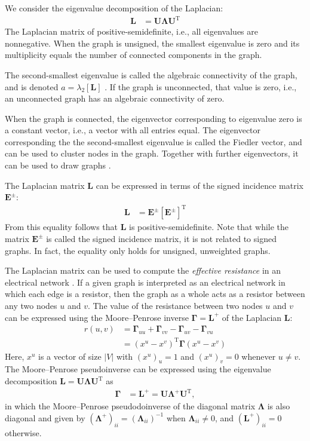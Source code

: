 \documentclass{article}
\begin{document}
We consider the eigenvalue decomposition of the Laplacian:
\begin{align}
  \mathbf L &= \mathbf U \mathbf \Lambda \mathbf U^{\mathrm T}
\end{align}
The Laplacian matrix of positive-semidefinite, i.e., all eigenvalues are
nonnegative.  
When the graph is unsigned, the smallest eigenvalue is zero and its
multiplicity equals the number of connected components in the graph. 

The second-smallest eigenvalue is called the algebraic connectivity of
the graph, and is denoted $a = \lambda_2[\mathbf L]$ \citep{b652}.  If the graph is
unconnected, that value is zero, i.e., an unconnected graph has an
algebraic connectivity of zero. 

When the graph is connected, the eigenvector corresponding to eigenvalue
zero is a constant vector, i.e., a vector with all entries equal. The
eigenvector corresponding the the second-smallest eigenvalue is called
the Fiedler vector, and can be used to cluster nodes in the
graph. Together with further eigenvectors, it can be used to draw
graphs \citep[see][]{kunegis:signed-kernels}. 

The Laplacian matrix $\mathbf L$ can be expressed in terms of the signed
incidence matrix $\mathbf E^{\pm}$:
\begin{align}
  \mathbf L &= \mathbf E^{\pm} [\mathbf E^{\pm}]^{\mathrm T}
\end{align}
From this equality follows that $\mathbf L$ is positive-semidefinite.   
Note that while the matrix $\mathbf E^{\pm}$ is called the signed
incidence matrix, it is not related to signed graphs.  In fact, the
equality only holds for unsigned, unweighted graphs. 

The Laplacian matrix can be used to compute the \emph{effective
  resistance} in an electrical network \citep{b101}.  If a given graph is interpreted
as an electrical network in which each edge is a resistor, then the
graph as a whole acts as a resistor between any two nodes $u$ and $v$.
The value of the resistance between two nodes $u$ and $v$ can be
expressed using the Moore--Penrose inverse $\mathbf \Gamma = \mathbf
L^+$ of the Laplacian $\mathbf L$:
\begin{align}
  r(u,v) &= \mathbf \Gamma_{uu} + \mathbf \Gamma_{vv} 
  - \mathbf \Gamma_{uv} - \mathbf \Gamma_{vu} \\
  &= (x^u - x^v)^{\mathrm T} \mathbf \Gamma (x^u - x^v)
\end{align}
Here, $x^u$ is a vector of size $|V|$ with $(x^u)_u=1$ and $(x^u)_v=0$
whenever $u \neq v$.  The Moore--Penrose pseudoinverse can be expressed
using the eigenvalue decomposition $\mathbf L = \mathbf U \mathbf
\Lambda \mathbf U^{\mathrm T}$ as
\begin{align}
  \mathbf \Gamma &= \mathbf L^+ = \mathbf U \mathbf \Lambda^+ \mathbf U^{\mathrm T},
\end{align}
in which the Moore--Penrose pseudodoinverse of the diagonal matrix
$\mathbf \Lambda$ is also diagonal and given by $(\mathbf
\Lambda^+)_{ii}=(\mathbf \Lambda_{ii})^{-1}$ when $\mathbf \Lambda_{ii} \neq
0$, and $(\mathbf L^+)_{ii}=0$ otherwise. 
\end{document}
